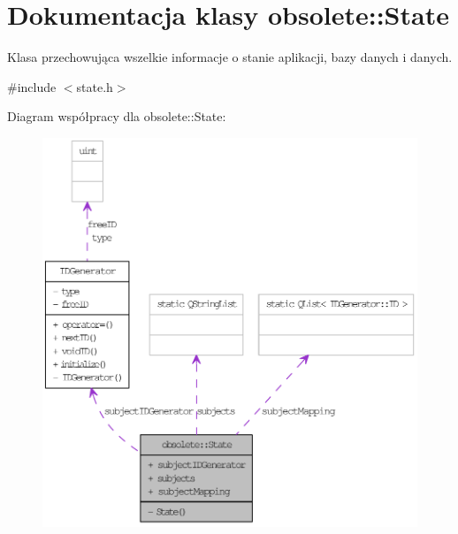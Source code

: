 \hypertarget{classobsolete_1_1State}{
\section{Dokumentacja klasy obsolete::State}
\label{classobsolete_1_1State}
}


Klasa przechowująca wszelkie informacje o stanie aplikacji, bazy danych i danych.  




{\ttfamily \#include $<$state.h$>$}



Diagram współpracy dla obsolete::State:\nopagebreak
\begin{figure}[H]
\begin{center}
\leavevmode
\includegraphics[width=400pt]{classobsolete_1_1State__coll__graph}
\end{center}
\end{figure}
